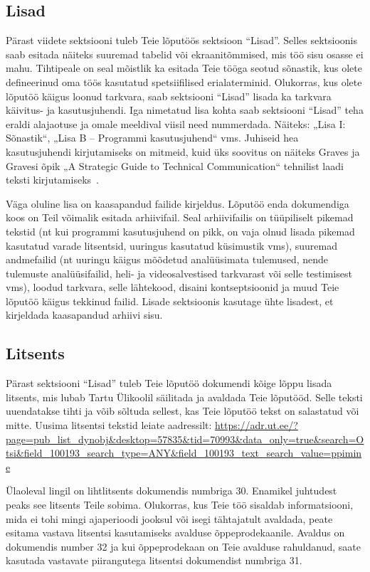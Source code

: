 \subsection{Lisad}
Pärast viidete sektsiooni tuleb Teie lõputöös sektsioon “Lisad”. Selles sektsioonis saab esitada näiteks suuremad tabelid või ekraanitõmmised, mis töö sisu osasse ei mahu. Tihtipeale on seal mõistlik ka esitada Teie tööga seotud sõnastik, kus olete defineerinud oma töös kasutatud spetsiifilised erialaterminid. Olukorras, kus olete lõputöö käigus loonud tarkvara, saab sektsiooni “Lisad” lisada ka tarkvara käivitus- ja kasutusjuhendi. Iga nimetatud lisa kohta saab sektsiooni “Lisad” teha eraldi alajaotuse ja omale meeldival viisil need nummerdada. Näiteks: „Lisa I: Sõnastik“, „Lisa B – Programmi kasutusjuhend“ vms. Juhiseid hea kasutusjuhendi kirjutamiseks on mitmeid, kuid üks soovitus on näiteks Graves ja Gravesi õpik „A Strategic Guide to Technical Communication“ tehnilist laadi teksti kirjutamiseks~\cite{graves_strategic_2012}.

Väga oluline lisa on kaasapandud failide kirjeldus. Lõputöö enda dokumendiga koos on Teil võimalik esitada arhiivifail. Seal arhiivifailis on tüüpiliselt pikemad tekstid (nt kui programmi kasutusjuhend on pikk, on vaja olnud lisada pikemad kasutatud varade litsentsid, uuringus kasutatud küsimustik vms), suuremad andmefailid (nt uuringu käigus mõõdetud analüüsimata tulemused, nende tulemuste analüüsifailid, heli- ja videosalvestised tarkvarast või selle testimisest vms), loodud tarkvara, selle lähtekood, disaini kontseptsioonid ja muud Teie lõputöö käigus tekkinud failid. Lisade sektsioonis kasutage ühte lisadest, et kirjeldada kaasapandud arhiivi sisu.

\subsection{Litsents} \label{subchapter:litsents}
Pärast sektsiooni “Lisad” tuleb Teie lõputöö dokumendi kõige lõppu lisada litsents, mis lubab Tartu Ülikoolil säilitada ja avaldada Teie lõputööd. Selle teksti uuendatakse tihti ja võib sõltuda sellest, kas Teie lõputöö tekst on salastatud või mitte. Uusima litsentsi tekstid leiate aadressilt: \url{https://adr.ut.ee/?page=pub_list_dynobj&desktop=57835&tid=70993&data_only=true&search=Otsi&field_100193_search_type=ANY&field_100193_text_search_value=ppimine}

Ülaoleval lingil on lihtlitsents dokumendis numbriga 30. Enamikel juhtudest peaks see litsents Teile sobima. Olukorras, kus Teie töö sisaldab informatsiooni, mida ei tohi mingi ajaperioodi jooksul või isegi tähtajatult avaldada, peate esitama vastava litsentsi kasutamiseks avalduse õppeprodekaanile. Avaldus on dokumendis number 32 ja kui õppeprodekaan on Teie avalduse rahuldanud, saate kasutada vastavate piirangutega litsentsi dokumendist numbriga 31.

